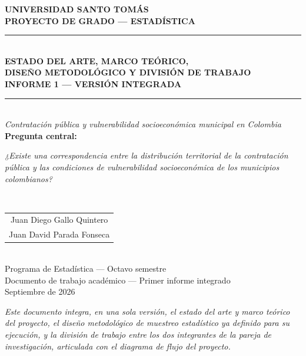 \documentclass[11pt,letterpaper]{article}
\begin{document}
\begin{titlepage}
\centering
\vspace*{1.0cm}
{\bfseries\large UNIVERSIDAD SANTO TOMÁS\\
PROYECTO DE GRADO --- ESTADÍSTICA}\\[0.6cm]
{\color{ustablue}\rule{0.85\linewidth}{1pt}}\\[0.5cm]
{\bfseries\Large ESTADO DEL ARTE, MARCO TEÓRICO,\\
DISEÑO METODOLÓGICO Y DIVISIÓN DE TRABAJO\\[0.2cm]
\large INFORME 1 --- VERSIÓN INTEGRADA}\\[0.6cm]
{\color{ustablue}\rule{0.85\linewidth}{1pt}}\\[0.9cm]

{\large\itshape Contratación pública y vulnerabilidad socioeconómica municipal en Colombia}\\[0.9cm]

{\bfseries Pregunta central:}\\[0.15cm]
\parbox{0.82\linewidth}{\centering\itshape
¿Existe una correspondencia entre la distribución territorial de la contratación pública
y las condiciones de vulnerabilidad socioeconómica de los municipios colombianos?}\\[1.3cm]

\begin{tabular}{c}
Juan Diego Gallo Quintero\\
Juan David Parada Fonseca
\end{tabular}\\[1.0cm]

Programa de Estadística --- Octavo semestre\\
Documento de trabajo académico --- Primer informe integrado\\
Septiembre de 2026

\vfill
{\small\itshape Este documento integra, en una sola versión, el estado del arte y
marco teórico del proyecto, el diseño metodológico de muestreo estadístico ya
definido para su ejecución, y la división de trabajo entre los dos integrantes
de la pareja de investigación, articulada con el diagrama de flujo del proyecto.}
\end{titlepage}

\tableofcontents
\newpage

\end{document}
